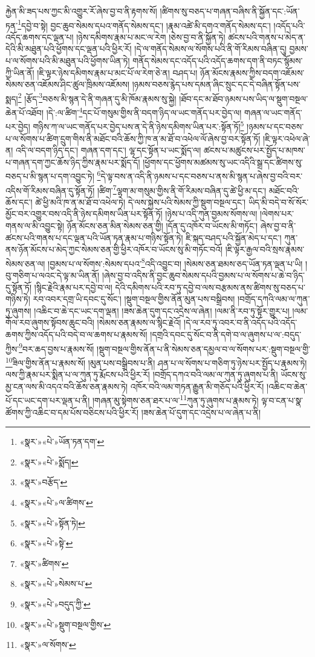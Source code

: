རྐྱེན་མི་ཟད་པས་ཀྱང་མི་འགྱུར་རོ་ཞེས་བྱ་བ་ནི་རྟགས་སོ། །ཚིགས་སུ་བཅད་པ་གཞན་བཞིས་ནི་སྐྱོན་དང་:ཡོན་ཏན་\footnote{«སྣར་»«པེ་»ཡོན་ཏན་དག་}དབྱེ་བ་སྟེ། བྱང་ཆུབ་སེམས་དཔའ་གནོད་སེམས་དང་། །རྣམ་འཚེ་མི་དགའ་གནོད་སེམས་དང་། །འདོད་པའི་འདོད་ཆགས་དང་ལྡན་པ། །ཉེས་དམིགས་རྣམ་པ་མང་ལ་རེག །ཅེས་བྱ་བ་ནི་སྐྱོན་ཏེ། ཚངས་པའི་གནས་པ་མེད་ན་དེའི་མི་མཐུན་པའི་ཕྱོགས་དང་ལྡན་པའི་ཕྱིར་རོ། །དེ་ལ་གནོད་སེམས་ལ་སོགས་པའི་ནི་གོ་རིམས་བཞིན་དུ། བྱམས་པ་ལ་སོགས་པའི་མི་མཐུན་པའི་ཕྱོགས་ཡིན་ཏེ། གནོད་སེམས་དང་འདོད་པའི་འདོད་ཆགས་དག་ནི་བཏང་སྙོམས་ཀྱི་ཡིན་ནོ། །ཇི་ལྟར་ཉེས་དམིགས་རྣམ་པ་མང་པོ་ལ་རེག་ཅེ་ན། བཤད་པ། ཉོན་མོངས་རྣམས་ཀྱིས་བདག་འཇོམས་སེམས་ཅན་འཇོམས་ཤིང་ཚུལ་ཁྲིམས་འཇོམས། །ཉམས་བཅས་རྙེད་པས་དམན་ཞིང་སྲུང་དང་དེ་བཞིན་སྟོན་པས་སྨད།\footnote{«སྣར་»«པེ་»སྨོད།} །རྩོད་\footnote{«སྣར་»བརྩོད་}བཅས་མི་སྙན་དེ་ནི་གཞན་དུ་མི་ཁོམ་རྣམས་སུ་སྐྱེ། །ཐོབ་དང་མ་ཐོབ་ཉམས་པས་ཡིད་ལ་སྡུག་བསྔལ་ཆེན་པོ་འཐོབ། །དེ་:ལ་ཚིག་\footnote{«སྣར་»«པེ་»ལ་ཚིགས་}དང་པོ་གསུམ་གྱིས་ནི་བདག་ཉིད་ལ་ཡང་གནོད་པར་བྱེད་ལ། གཞན་ལ་ཡང་གནོད་པར་བྱེད། གཉིས་ཀ་ལ་ཡང་གནོད་པར་བྱེད་པས་ན་དེ་ནི་ཉེས་དམིགས་ཡིན་པར་:སྟོན་ཏོ།\footnote{«སྣར་»«པེ་»སྟོན་ཏེ།} །ཉམས་པ་དང་བཅས་པ་ལ་སོགས་པ་ཚིག་དྲུག་གིས་ནི་མཐོང་བའི་ཆོས་ཀྱི་ཁ་ན་མ་ཐོ་བ་འཕེལ་ལོ་ཞེས་བྱ་བར་སྟོན་ཏོ། །ཇི་ལྟར་འཕེལ་ཞེ་ན། འདི་ལ་བདག་ཉིད་དང་། གཞན་དག་དང་། ལྷ་དང་སྟོན་པ་ཡང་སྨོད་ལ། ཚངས་པ་མཚུངས་པར་སྤྱོད་པ་མཁས་པ་གཞན་དག་ཀྱང་ཆོས་ཉིད་ཀྱིས་རྣམ་པར་སྨོད་དོ། །ཕྱོགས་དང་ཕྱོགས་མཚམས་སུ་ཡང་འདིའི་སྒྲ་དང་ཚིགས་སུ་བཅད་པ་མི་སྙན་པ་དག་འབྱུང་ཏེ། \footnote{«སྣར་»«པེ་»སྟེ་}དེ་ལྟ་བས་ན་འདི་ནི་ཉམས་པ་དང་བཅས་པ་ནས་མི་སྙན་པ་ཞེས་བྱ་བའི་བར་འདིས་གོ་རིམས་བཞིན་དུ་སྟོན་ཏོ། །ཚིག་\footnote{«སྣར་»ཚིགས་}ལྷག་མ་གསུམ་གྱིས་ནི་གོ་རིམས་བཞིན་དུ་ཚེ་ཕྱི་མ་དང་། མཐོང་བའི་ཆོས་དང་། ཚེ་ཕྱི་མའི་ཁ་ན་མ་ཐོ་བ་འཕེལ་ཏེ། དེ་ལས་སྐྱེས་པའི་སེམས་ཀྱི་སྡུག་བསྔལ་དང་། ཡིད་མི་བདེ་བ་སོ་སོར་མྱོང་བར་འགྱུར་བས་འདི་ནི་ཉེས་དམིགས་ཡིན་པར་སྟོན་ཏོ། །ཉེས་པ་འདི་ཀུན་བྱམས་སོགས་ལ། །ལེགས་པར་གནས་ལ་མི་འབྱུང་སྟེ། ཉོན་མོངས་ཅན་མིན་སེམས་ཅན་གྱི། །དོན་དུ་འཁོར་བ་ཡོངས་མི་གཏོང་། ཞེས་བྱ་བ་ནི་ཚངས་པའི་གནས་པ་དང་ལྡན་པའི་ཡོན་ཏན་རྣམ་པ་གཉིས་སྟོན་ཏེ། ཇི་སྐད་བཤད་པའི་སྐྱོན་མེད་པ་དང་། ཀུན་ནས་ཉོན་མོངས་པ་མེད་ཀྱང་སེམས་ཅན་གྱི་ཕྱིར་འཁོར་བ་ཡོངས་སུ་མི་གཏོང་བའོ། །ཇི་ལྟར་རྒྱལ་བའི་སྲས་རྣམས་སེམས་ཅན་ལ། །བྱམས་པ་ལ་སོགས་:སེམས་དཔའ་\footnote{«སྣར་»«པེ་»སེམས་པ་}འདི་འབྱུང་བ། །སེམས་ཅན་ཐམས་ཅད་ཡོན་ཏན་ལྡན་པ་ཡི། །བུ་གཅིག་པ་ལའང་དེ་ལྟ་མ་ཡིན་ནོ། །ཞེས་བྱ་བ་འདིས་ནི་བྱང་ཆུབ་སེམས་དཔའི་བྱམས་པ་ལ་སོགས་པ་ཆེ་བ་ཉིད་དུ་སྟོན་ཏོ། །སྙིང་རྗེའི་རྣམ་པར་དབྱེ་བ་ལ། དེའི་དམིགས་པའི་རབ་ཏུ་དབྱེ་བ་ལས་བརྩམས་ནས་ཚིགས་སུ་བཅད་པ་གཉིས་ཏེ། རབ་འབར་དགྲ་ཡི་དབང་དུ་སོང་། །སྡུག་བསྔལ་གྱིས་ནོན་མུན་པས་བསྒྲིབས། །བགྲོད་དཀའི་ལམ་ལ་ཀུན་ཏུ་ཞུགས། །འཆིང་བ་ཆེ་དང་ཡང་དག་ལྡན། །ཟས་ཆེན་དུག་དང་འདྲེས་ལ་ཞེན། །ལམ་ནི་རབ་ཏུ་སྟོར་གྱུར་པ། །ལམ་གོལ་རབ་ཞུགས་སྟོབས་ཆུང་བའི། །སེམས་ཅན་རྣམས་ལ་སྙིང་རྗེའོ། །དེ་ལ་རབ་ཏུ་འབར་བ་ནི་འདོད་པའི་འདོད་ཆགས་ཀྱིས་འདོད་པའི་བདེ་བ་ལ་ཆགས་པ་རྣམས་སོ། །དགྲའི་དབང་དུ་སོང་བ་ནི་དགེ་བ་ལ་ཞུགས་པ་ལ་:བདུད་ཀྱིས་\footnote{«སྣར་»«པེ་»བདུད་ཀྱི་}བར་ཆད་བྱས་པ་རྣམས་སོ། །སྡུག་བསྔལ་གྱིས་ནོན་པ་ནི་སེམས་ཅན་དམྱལ་བ་ལ་སོགས་པར་:སྡུག་བསྔལ་གྱི་\footnote{«སྣར་»«པེ་»སྡུག་བསྔལ་གྱིས་}ཟིལ་གྱིས་ནོན་པ་རྣམས་སོ། །མུན་པས་བསྒྲིབས་པ་ནི། ཤན་པ་ལ་སོགས་པ་གཅིག་ཏུ་ཉེས་པར་སྤྱོད་པ་རྣམས་ཏེ། ལས་ཀྱི་རྣམ་པར་སྨིན་པ་ལ་ཀུན་ཏུ་རྨོངས་པའི་ཕྱིར་རོ། །བགྲོད་དཀའ་བའི་ལམ་ལ་ཀུན་ཏུ་ཞུགས་པ་ནི། ཡོངས་སུ་མྱ་ངན་ལས་མི་འདའ་བའི་ཆོས་ཅན་རྣམས་ཏེ། འཁོར་བའི་ལམ་གཏན་རྒྱུན་མི་གཅོད་པའི་ཕྱིར་རོ། །འཆིང་བ་ཆེན་པོ་དང་ཡང་དག་པར་ལྡན་པ་ནི། །གཞན་མུ་སྟེགས་ཅན་ཐར་པ་ལ་\footnote{«སྣར་»ལ་སོགས་}ཀུན་ཏུ་ཞུགས་པ་རྣམས་ཏེ། ལྟ་བ་ངན་པ་སྣ་ཚོགས་ཀྱི་འཆིང་བ་དམ་པོས་བཅིངས་པའི་ཕྱིར་རོ། །ཟས་ཆེན་པོ་དུག་དང་འདྲེས་པ་ལ་ཞེན་པ་ནི། 